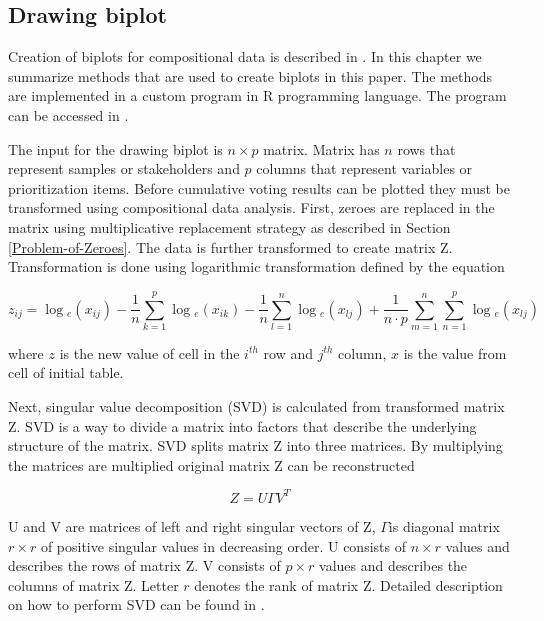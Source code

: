 \subsection{Drawing biplot}

Creation of biplots for compositional data is described in \cite{Aitchison2002}.
In this chapter we summarize methods that are used to create biplots
in this paper. The methods are implemented in a custom program in
R programming language. The program can be accessed in .

The input for the drawing biplot is $n\times p$ matrix. Matrix has
$n$ rows that represent samples or stakeholders and $p$ columns
that represent variables or prioritization items. Before cumulative
voting results can be plotted they must be transformed using compositional
data analysis. First, zeroes are replaced in the matrix using multiplicative
replacement strategy as described in Section \ref{Problem-of-Zeroes}.
The data is further transformed to create matrix Z. Transformation
is done using logarithmic transformation defined by the equation

\begin{equation}
z_{ij}=\log{}_{e}(x_{ij})-\frac{1}{n}\sum_{k=1}^{p}\log{}_{e}(x_{ik})-\frac{1}{n}\sum_{l=1}^{n}\log{}_{e}(x_{lj})+\frac{1}{n\cdot p}\sum_{m=1}^{n}\sum_{n=1}^{p}\log{}_{e}(x_{lj})\label{eq:biplot}
\end{equation}

where $z$ is the new value of cell in the $i^{th}$ row and $j^{th}$
column, $x$ is the value from cell of initial table.

Next, singular value decomposition (SVD) is calculated from transformed
matrix Z. SVD is a way to divide a matrix into factors that describe
the underlying structure of the matrix. SVD splits matrix Z into three
matrices. By multiplying the matrices are multiplied original matrix
Z can be reconstructed

\begin{equation}
Z=U\Gamma V^{T}\label{eq:SVD}
\end{equation}

U and V are matrices of left and right singular vectors of Z, $\Gamma$is
diagonal matrix $r\times r$ of positive singular values in decreasing
order. U consists of $n\times r$ values and describes the rows of
matrix Z. V consists of $p\times r$ values and describes the columns
of matrix Z. Letter $r$ denotes the rank of matrix Z. Detailed description
on how to perform SVD can be found in \cite{Golub1970}.

